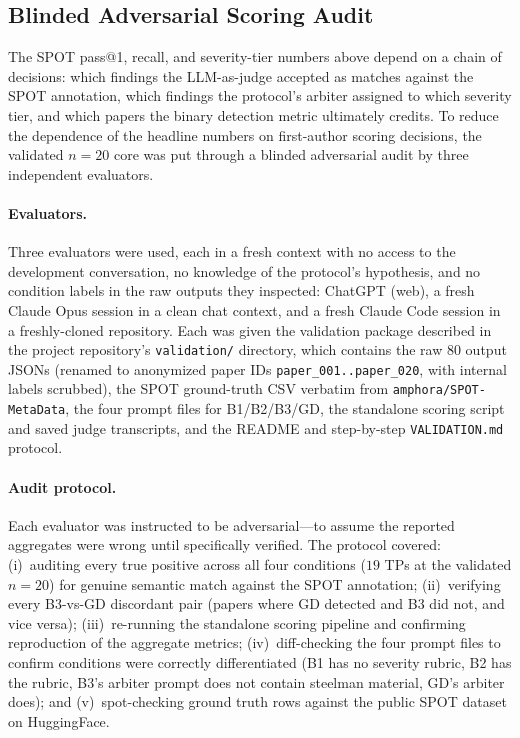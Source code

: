 \documentclass[11pt]{article}
\theoremstyle{definition}
\begin{document}
\subsection{Blinded Adversarial Scoring Audit}
\label{sec:results:audit}

The SPOT pass@1, recall, and severity-tier numbers above depend on a chain of decisions: which findings the LLM-as-judge accepted as matches against the SPOT annotation, which findings the protocol's arbiter assigned to which severity tier, and which papers the binary detection metric ultimately credits. To reduce the dependence of the headline numbers on first-author scoring decisions, the validated $n = 20$ core was put through a blinded adversarial audit by three independent evaluators.

\paragraph{Evaluators.} Three evaluators were used, each in a fresh context with no access to the development conversation, no knowledge of the protocol's hypothesis, and no condition labels in the raw outputs they inspected: ChatGPT (web), a fresh Claude Opus session in a clean chat context, and a fresh Claude Code session in a freshly-cloned repository. Each was given the validation package described in the project repository's \texttt{validation/} directory, which contains the raw $80$ output JSONs (renamed to anonymized paper IDs \texttt{paper\_001..paper\_020}, with internal labels scrubbed), the SPOT ground-truth CSV verbatim from \texttt{amphora/SPOT-MetaData}, the four prompt files for B1/B2/B3/GD, the standalone scoring script and saved judge transcripts, and the README and step-by-step \texttt{VALIDATION.md} protocol.

\paragraph{Audit protocol.} Each evaluator was instructed to be adversarial---to assume the reported aggregates were wrong until specifically verified. The protocol covered: (i)~auditing every true positive across all four conditions ($19$ TPs at the validated $n = 20$) for genuine semantic match against the SPOT annotation; (ii)~verifying every B3-vs-GD discordant pair (papers where GD detected and B3 did not, and vice versa); (iii)~re-running the standalone scoring pipeline and confirming reproduction of the aggregate metrics; (iv)~diff-checking the four prompt files to confirm conditions were correctly differentiated (B1 has no severity rubric, B2 has the rubric, B3's arbiter prompt does not contain steelman material, GD's arbiter does); and (v)~spot-checking ground truth rows against the public SPOT dataset on HuggingFace.
\end{document}
